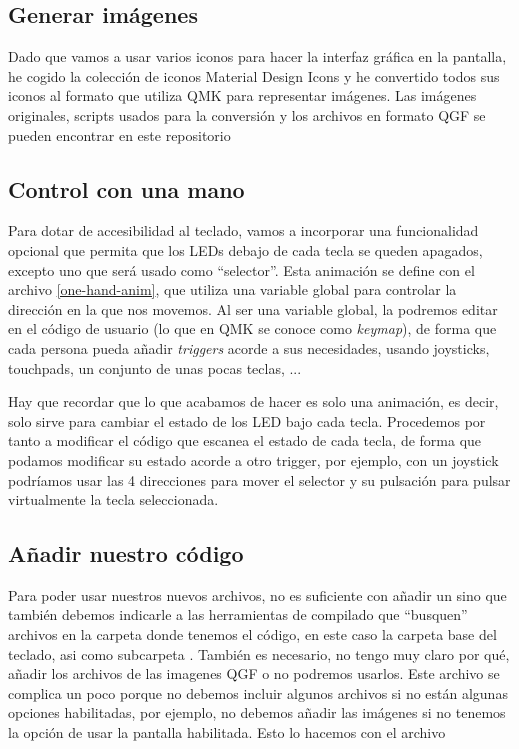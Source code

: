 \subsection{Generar imágenes}
Dado que vamos a usar varios iconos para hacer la interfaz gráfica en la pantalla, he cogido la colección de iconos Material Design Icons\cite{templarian-mdi} y he convertido todos sus iconos al formato que utiliza QMK para representar imágenes. Las imágenes originales, scripts usados para la conversión y los archivos en formato QGF\cite{qgf} se pueden encontrar en este repositorio\cite{mdi-qgf}

\subsection{Control con una mano}
Para dotar de accesibilidad al teclado, vamos a incorporar una funcionalidad opcional que permita que los LEDs debajo de cada tecla se queden apagados, excepto uno que será usado como ``selector''. Esta animación se define con el archivo \ref{one-hand-anim}, que utiliza una variable global para controlar la dirección en la que nos movemos. Al ser una variable global, la podremos editar en el código de usuario (lo que en QMK se conoce como \textit{keymap}), de forma que cada persona pueda añadir \textit{triggers} acorde a sus necesidades, usando joysticks, touchpads, un conjunto de unas pocas teclas, ... \par
Hay que recordar que lo que acabamos de hacer es solo una animación, es decir, solo sirve para cambiar el estado de los LED bajo cada tecla. Procedemos por tanto a modificar el código que escanea el estado de cada tecla, de forma que podamos modificar su estado acorde a otro trigger, por ejemplo, con un joystick podríamos usar las 4 direcciones para mover el selector y su pulsación para pulsar virtualmente la tecla seleccionada.

\subsection{Añadir nuestro código}
Para poder usar nuestros nuevos archivos, no es suficiente con añadir un  sino que también debemos indicarle a las herramientas de compilado que ``busquen'' archivos en la carpeta donde tenemos el código, en este caso la carpeta base del teclado, asi como subcarpeta . También es necesario, no tengo muy claro por qué, añadir los archivos  de las imagenes QGF o no podremos usarlos. Este archivo se complica un poco porque no debemos incluir algunos archivos si no están algunas opciones habilitadas, por ejemplo, no debemos añadir las imágenes si no tenemos la opción de usar la pantalla habilitada. Esto lo hacemos con el archivo \cite{rules-mk}

